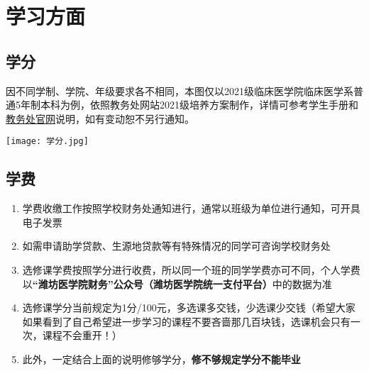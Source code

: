 \chapter[学习方面]{学习方面}
\section[学分]{学分}
因不同学制、学院、年级要求各不相同，本图仅以2021级临床医学院临床医学系普通5年制本科为例，依照教务处网站2021级培养方案制作，详情可参考学生手册和\href{https://jwch.wfmc.edu.cn/2022/0916/c5343a107934/page.htm}{\uline{教务处官网}}说明，如有变动恕不另行通知。
\begin{table}[ht]
    \centering
    \texttt{[image: 学分.jpg]}
\end{table}

\section[学费]{学费}
\begin{enumerate}
    \item 学费收缴工作按照学校财务处通知进行，通常以班级为单位进行通知，可开具电子发票
    \item 如需申请助学贷款、生源地贷款等有特殊情况的同学可咨询学校财务处
    \item 选修课学费按照学分进行收费，所以同一个班的同学学费亦可不同，个人学费以\textbf{“潍坊医学院财务”公众号（潍坊医学院统一支付平台）}中的数据为准
    \item 选修课学分当前规定为1分/100元，多选课多交钱，少选课少交钱（希望大家如果看到了自己希望进一步学习的课程不要吝啬那几百块钱，选课机会只有一次，课程不会重开！）
    \item 此外，一定结合上面的说明修够学分，\textbf{修不够规定学分不能毕业}
\end{enumerate}